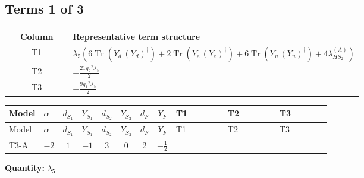 \documentclass[8pt]{article}
\begin{document}
\begin{landscape}
\subsection*{Terms 1 of 3}
\begin{center}
\begin{tabular}{@{}c >{\raggedright\arraybackslash}p{0.82\linewidth}@{}}
\toprule
Column & Representative term structure \\
\midrule
T1 & \(\displaystyle {\lambda_5} (6 \operatorname{Tr}\!\left({Y_d}\,\left({Y_d}\right)^{\dagger}\right)+2 \operatorname{Tr}\!\left({Y_e}\,\left({Y_e}\right)^{\dagger}\right)+6 \operatorname{Tr}\!\left({Y_u}\,\left({Y_u}\right)^{\dagger}\right)+4 {\lambda_{HS_2}^{(A)}})\) \\
\midrule
T2 & \(\displaystyle -\frac{21 {g_2}^2 {\lambda_5}}{2}\) \\
\midrule
T3 & \(\displaystyle -\frac{9 {g_1}^2 {\lambda_5}}{2}\) \\
\midrule
\bottomrule
\end{tabular}
\end{center}
\smallskip
\tiny
\begin{longtable}{@{}llcccccc >{\raggedright\arraybackslash}p{0.21\linewidth} >{\raggedright\arraybackslash}p{0.21\linewidth} >{\raggedright\arraybackslash}p{0.21\linewidth}@{}}
\toprule
Model & $\alpha$ & $d_{S_1}$ & $Y_{S_1}$ & $d_{S_2}$ & $Y_{S_2}$ & $d_F$ & $Y_F$ & T1 & T2 & T3 \\
\midrule
\endfirsthead
\toprule
Model & $\alpha$ & $d_{S_1}$ & $Y_{S_1}$ & $d_{S_2}$ & $Y_{S_2}$ & $d_F$ & $Y_F$ & T1 & T2 & T3 \\
\midrule
\endhead
T3-A & $-2$ & $1$ & $-1$ & $3$ & $0$ & $2$ & $-\frac{1}{2}$ & \scriptsize\adjustbox{max width=\linewidth}{$\begin{gathered} {\lambda_5} (6 \operatorname{Tr}\!\left({Y_d}\,\left({Y_d}\right)^{\dagger}\right)+2 \operatorname{Tr}\!\left({Y_e}\,\left({Y_e}\right)^{\dagger}\right)+6 \operatorname{Tr}\!\left({Y_u}\,\left({Y_u}\right)^{\dagger}\right)+4 {\lambda_{HS_2}^{(A)}})\end{gathered}$} & \scriptsize\adjustbox{max width=\linewidth}{$\begin{gathered} -\frac{21 {g_2}^2 {\lambda_5}}{2}\end{gathered}$} & \scriptsize\adjustbox{max width=\linewidth}{$\begin{gathered} -\frac{9 {g_1}^2 {\lambda_5}}{2}\end{gathered}$} \\
\midrule
\bottomrule
\end{longtable}
\clearpage
\noindent\textbf{Quantity: }$\lambda_5$\par\smallskip

\end{landscape}
\end{document}
